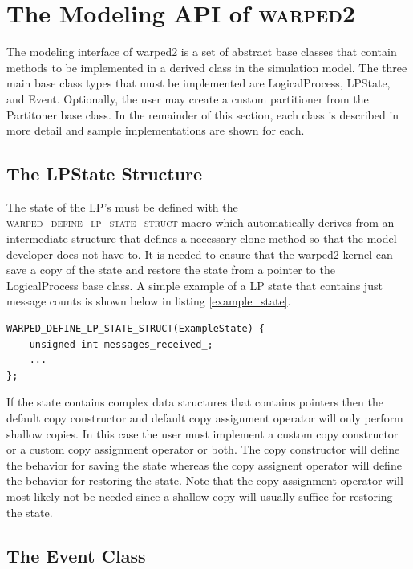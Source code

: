 \documentclass[11pt]{book}
\begin{document}
\section{The Modeling API of \textsc{warped2}}

The modeling interface of warped2 is a set of abstract base classes that contain methods
to be implemented in a derived class in the simulation model. The three main base class
types that must be implemented are LogicalProcess, LPState, and Event. Optionally, the user
may create a custom partitioner from the Partitoner base class. In the remainder of this
section, each class is described in more detail and sample implementations are shown for each.

\subsection{The LPState Structure}

The state of the LP's must be defined with the \textsc{warped\_define\_lp\_state\_struct}
macro which automatically derives from an intermediate structure that defines a necessary
clone method so that the model developer does not have to. It is needed to ensure that the warped2
kernel can save a copy of the state and restore the state from a pointer to the LogicalProcess
base class. A simple example of a LP state that contains just message counts is shown below in
listing \ref{example_state}.

\begin{lstlisting}[caption=Example \textsc{warped2} State Definition, label=example_state, float]
WARPED_DEFINE_LP_STATE_STRUCT(ExampleState) {
    unsigned int messages_received_;
    ...
};
\end{lstlisting}

If the state contains complex data structures that contains pointers then the default copy
constructor and default copy assignment operator will only perform shallow copies. In this
case the user must implement a custom copy constructor or a custom copy assignment operator
or both. The copy constructor will define the behavior for saving the state whereas the
copy assignent operator will define the behavior for restoring the state. Note that the
copy assignment operator will most likely not be needed since a shallow copy will usually
suffice for restoring the state.

\subsection{The Event Class}
\end{document}
